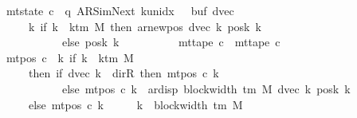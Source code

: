 \begin{isabellebody}
\ \ \ \ \ \ \ \ \ {\isasymand}\ mt{\isacharunderscore}{\kern0pt}state\ c\ {\isacharequal}{\kern0pt}\ {\isacharparenleft}{\kern0pt}q{\isacharcomma}{\kern0pt}\ AR{\isacharunderscore}{\kern0pt}SimNext{\isacharcomma}{\kern0pt}\ k{\isacharunderscore}{\kern0pt}unidx\ {}{\isacharcomma}{\kern0pt}\ {}{\isacharcomma}{\kern0pt}\ buf{}{\isacharcomma}{\kern0pt}\ dvec{\isacharcomma}{\kern0pt}\isanewline
\ \ \ \ \ \ \ \ \ \ \ \ \ \ {\isacharparenleft}{\kern0pt}{\isasymlambda}k{\isachardot}{\kern0pt}\ if\ k\ {\isacharless}{\kern0pt}\ k{\isacharunderscore}{\kern0pt}tm\ M\ then\ ar{\isacharunderscore}{\kern0pt}newpos\ {\isacharparenleft}{\kern0pt}dvec\ k{\isacharparenright}{\kern0pt}\ {\isacharparenleft}{\kern0pt}posk{}\ k{\isacharparenright}{\kern0pt}\isanewline
\ \ \ \ \ \ \ \ \ \ \ \ \ \ \ \ \ \ \ \ else\ posk{}\ k{\isacharparenright}{\kern0pt}{\isacharparenright}{\kern0pt}\isanewline
\ \ \ \ \ \ \ \ \ {\isasymand}\ mt{\isacharunderscore}{\kern0pt}tape\ c\ {\isacharequal}{\kern0pt}\ mt{\isacharunderscore}{\kern0pt}tape\ c{}\isanewline
\ \ \ \ \ \ \ \ \ {\isasymand}\ mt{\isacharunderscore}{\kern0pt}pos\ c\ {\isacharequal}{\kern0pt}\ {\isacharparenleft}{\kern0pt}{\isasymlambda}k{\isachardot}{\kern0pt}\ if\ k\ {\isacharless}{\kern0pt}\ k{\isacharunderscore}{\kern0pt}tm\ M\isanewline
\ \ \ \ \ \ \ \ \ \ \ \ \ \ then\ {\isacharparenleft}{\kern0pt}if\ dvec\ k\ {\isacharequal}{\kern0pt}\ dir{\isachardot}{\kern0pt}R\ then\ mt{\isacharunderscore}{\kern0pt}pos\ c{}\ k\isanewline
\ \ \ \ \ \ \ \ \ \ \ \ \ \ \ \ \ \ \ \ else\ mt{\isacharunderscore}{\kern0pt}pos\ c{}\ k\ {\isacharminus}{\kern0pt}\ ar{\isacharunderscore}{\kern0pt}disp\ {\isacharparenleft}{\kern0pt}block{\isacharunderscore}{\kern0pt}width\ {\isacharparenleft}{\kern0pt}{\isasymGamma}{\isacharunderscore}{\kern0pt}tm\ M{\isacharparenright}{\kern0pt}{\isacharparenright}{\kern0pt}\ {\isacharparenleft}{\kern0pt}dvec\ k{\isacharparenright}{\kern0pt}\ {\isacharparenleft}{\kern0pt}posk{}\ k{\isacharparenright}{\kern0pt}{\isacharparenright}{\kern0pt}\isanewline
\ \ \ \ \ \ \ \ \ \ \ \ \ \ else\ mt{\isacharunderscore}{\kern0pt}pos\ c{}\ k{\isacharparenright}{\kern0pt}{\isachardoublequoteclose}\isanewline
%
\isadelimproof
%
\endisadelimproof
%
\isatagproof
{}\isamarkupfalse%
\ {\isacharminus}{\kern0pt}\isanewline
\ \ \isamarkupfalse%
\ {\isacharquery}{\kern0pt}k\ {\isacharequal}{\kern0pt}\ {\isachardoublequoteopen}block{\isacharunderscore}{\kern0pt}width\ {\isacharparenleft}{\kern0pt}{\isasymGamma}{\isacharunderscore}{\kern0pt}tm\ M{\isacharparenright}{\kern0pt}{\isachardoublequoteclose}\isanewline

\end{isabellebody}
